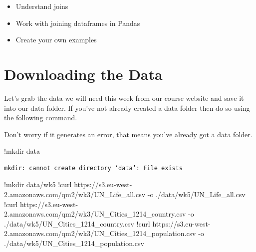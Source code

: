 \documentclass[
  letterpaper,
  DIV=11,
  numbers=noendperiod]{scrreprt}
\newenvironment{Shaded}{\begin{snugshade}}{\end{snugshade}}
\newcommand{\ErrorTok}[1]{\textcolor[rgb]{0.68,0.00,0.00}{#1}}
\newcommand{\FloatTok}[1]{\textcolor[rgb]{0.68,0.00,0.00}{#1}}
\newcommand{\NormalTok}[1]{\textcolor[rgb]{0.00,0.23,0.31}{#1}}
\newcommand{\OperatorTok}[1]{\textcolor[rgb]{0.37,0.37,0.37}{#1}}
\providecommand{\tightlist}{%
  \setlength{\itemsep}{0pt}\setlength{\parskip}{0pt}}\usepackage{longtable,booktabs,array}
\begin{document}
\begin{itemize}
\tightlist
\item
  Understand joins
\item
  Work with joining dataframes in Pandas
\item
  Create your own examples
\end{itemize}

\hypertarget{downloading-the-data-2}{%
\section{Downloading the Data}\label{downloading-the-data-2}}

Let's grab the data we will need this week from our course website and
save it into our data folder. If you've not already created a data
folder then do so using the following command.

Don't worry if it generates an error, that means you've already got a
data folder.

\begin{Shaded}
\begin{Highlighting}[]
\OperatorTok{!}\NormalTok{mkdir data}
\end{Highlighting}
\end{Shaded}

\begin{verbatim}
mkdir: cannot create directory ‘data’: File exists
\end{verbatim}

\begin{Shaded}
\begin{Highlighting}[]
\OperatorTok{!}\NormalTok{mkdir data}\OperatorTok{/}\NormalTok{wk5}
\OperatorTok{!}\NormalTok{curl https:}\OperatorTok{//}\NormalTok{s3.eu}\OperatorTok{{-}}\NormalTok{west}\OperatorTok{{-}}\FloatTok{2.}\ErrorTok{amazonaws}\NormalTok{.com}\OperatorTok{/}\NormalTok{qm2}\OperatorTok{/}\NormalTok{wk3}\OperatorTok{/}\NormalTok{UN\_Life\_all.csv }\OperatorTok{{-}}\NormalTok{o .}\OperatorTok{/}\NormalTok{data}\OperatorTok{/}\NormalTok{wk5}\OperatorTok{/}\NormalTok{UN\_Life\_all.csv}
\OperatorTok{!}\NormalTok{curl https:}\OperatorTok{//}\NormalTok{s3.eu}\OperatorTok{{-}}\NormalTok{west}\OperatorTok{{-}}\FloatTok{2.}\ErrorTok{amazonaws}\NormalTok{.com}\OperatorTok{/}\NormalTok{qm2}\OperatorTok{/}\NormalTok{wk3}\OperatorTok{/}\NormalTok{UN\_Cities\_1214\_country.csv }\OperatorTok{{-}}\NormalTok{o .}\OperatorTok{/}\NormalTok{data}\OperatorTok{/}\NormalTok{wk5}\OperatorTok{/}\NormalTok{UN\_Cities\_1214\_country.csv}
\OperatorTok{!}\NormalTok{curl https:}\OperatorTok{//}\NormalTok{s3.eu}\OperatorTok{{-}}\NormalTok{west}\OperatorTok{{-}}\FloatTok{2.}\ErrorTok{amazonaws}\NormalTok{.com}\OperatorTok{/}\NormalTok{qm2}\OperatorTok{/}\NormalTok{wk3}\OperatorTok{/}\NormalTok{UN\_Cities\_1214\_population.csv }\OperatorTok{{-}}\NormalTok{o .}\OperatorTok{/}\NormalTok{data}\OperatorTok{/}\NormalTok{wk5}\OperatorTok{/}\NormalTok{UN\_Cities\_1214\_population.csv}
\end{Highlighting}
\end{Shaded}
\end{document}
